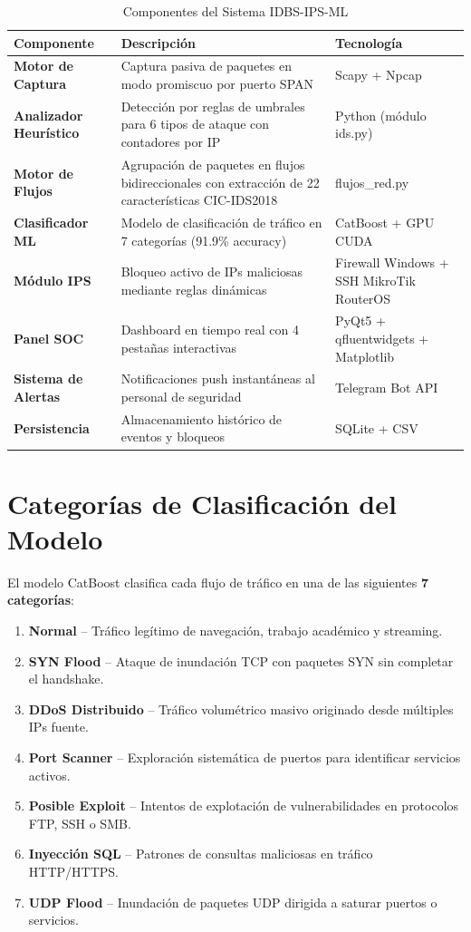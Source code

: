 \documentclass[12pt, letterpaper, oneside]{report}
\newcommand{\tabhead}[1]{\textbf{\color{white}#1}}
\begin{document}
\begin{table}[H]
  \centering
  \caption{Componentes del Sistema IDBS-IPS-ML}
  \label{tab:componentes}
  \begin{tabularx}{\textwidth}{>{\bfseries}p{3.5cm} X p{4cm}}
    \toprule
    \rowcolor{unipazblue}
    \tabhead{Componente} & \tabhead{Descripción} & \tabhead{Tecnología} \\
    \midrule
    Motor de Captura & Captura pasiva de paquetes en modo promiscuo por puerto SPAN & Scapy + Npcap \\
    Analizador Heurístico & Detección por reglas de umbrales para 6 tipos de ataque con contadores por IP & Python (módulo ids.py) \\
    Motor de Flujos & Agrupación de paquetes en flujos bidireccionales con extracción de 22 características CIC-IDS2018 & flujos\_red.py \\
    Clasificador ML & Modelo de clasificación de tráfico en 7 categorías (91.9\% accuracy) & CatBoost + GPU CUDA \\
    Módulo IPS & Bloqueo activo de IPs maliciosas mediante reglas dinámicas & Firewall Windows + SSH MikroTik RouterOS \\
    Panel SOC & Dashboard en tiempo real con 4 pestañas interactivas & PyQt5 + qfluentwidgets + Matplotlib \\
    Sistema de Alertas & Notificaciones push instantáneas al personal de seguridad & Telegram Bot API \\
    Persistencia & Almacenamiento histórico de eventos y bloqueos & SQLite + CSV \\
    \bottomrule
  \end{tabularx}
\end{table}

\section{Categorías de Clasificación del Modelo}

El modelo CatBoost clasifica cada flujo de tráfico en una de las siguientes \textbf{7 categorías}:

\begin{enumerate}[leftmargin=*]
  \item \textbf{Normal} -- Tráfico legítimo de navegación, trabajo académico y streaming.
  \item \textbf{SYN Flood} -- Ataque de inundación TCP con paquetes SYN sin completar el handshake.
  \item \textbf{DDoS Distribuido} -- Tráfico volumétrico masivo originado desde múltiples IPs fuente.
  \item \textbf{Port Scanner} -- Exploración sistemática de puertos para identificar servicios activos.
  \item \textbf{Posible Exploit} -- Intentos de explotación de vulnerabilidades en protocolos FTP, SSH o SMB.
  \item \textbf{Inyección SQL} -- Patrones de consultas maliciosas en tráfico HTTP/HTTPS.
  \item \textbf{UDP Flood} -- Inundación de paquetes UDP dirigida a saturar puertos o servicios.
\end{enumerate}
\end{document}
